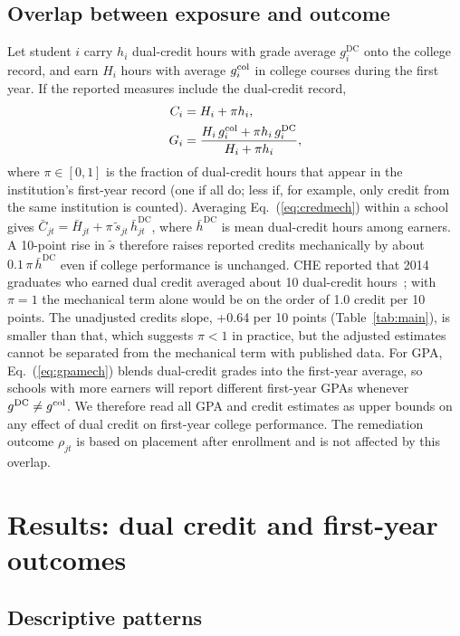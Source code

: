\documentclass[aps,prd,reprint,superscriptaddress,nofootinbib,floatfix]{revtex4-2}
\newcommand{\DC}{\mathrm{DC}}
\begin{document}
\subsection{Overlap between exposure and outcome}\label{sec:overlap}

Let student $i$ carry $h_i$ dual-credit hours with grade average $g^{\DC}_i$ onto the college record, and earn $H_i$ hours with average $g^{\rm col}_i$ in college courses during the first year. If the reported measures include the dual-credit record,
\begin{align}
C_i&=H_i+\pi h_i,\label{eq:credmech}\\
G_i&=\frac{H_i\,g^{\rm col}_i+\pi h_i\,g^{\DC}_i}{H_i+\pi h_i},\label{eq:gpamech}
\end{align}
where $\pi\in[0,1]$ is the fraction of dual-credit hours that appear in the institution's first-year record (one if all do; less if, for example, only credit from the same institution is counted). Averaging Eq.~(\ref{eq:credmech}) within a school gives $\bar C_{jt}=\bar H_{jt}+\pi\,\tilde s_{jt}\,\bar h^{\DC}_{jt}$, where $\bar h^{\DC}$ is mean dual-credit hours among earners. A 10-point rise in $\tilde s$ therefore raises reported credits mechanically by about $0.1\,\pi\,\bar h^{\DC}$ even if college performance is unchanged. CHE reported that 2014 graduates who earned dual credit averaged about 10 dual-credit hours~\cite{che2016}; with $\pi=1$ the mechanical term alone would be on the order of 1.0 credit per 10 points. The unadjusted credits slope, +0.64 per 10 points (Table~\ref{tab:main}), is smaller than that, which suggests $\pi<1$ in practice, but the adjusted estimates cannot be separated from the mechanical term with published data. For GPA, Eq.~(\ref{eq:gpamech}) blends dual-credit grades into the first-year average, so schools with more earners will report different first-year GPAs whenever $g^{\DC}\neq g^{\rm col}$. We therefore read all GPA and credit estimates as upper bounds on any effect of dual credit on first-year college performance. The remediation outcome $\rho_{jt}$ is based on placement after enrollment and is not affected by this overlap.

\section{Results: dual credit and first-year outcomes}\label{sec:results}

\subsection{Descriptive patterns}
\end{document}
